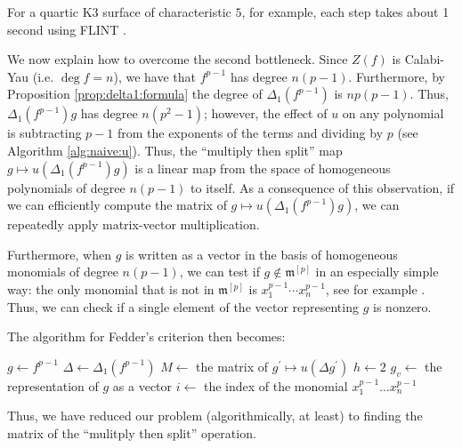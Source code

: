\documentclass[a4paper]{article}
\theoremstyle{definition}
\theoremstyle{remark}
\begin{document}
\noindent For a quartic K3 surface of characteristic \(5\),
for example, each step takes about 1 second 
using FLINT \cite{flint-2023-flint}. 

We now explain how to overcome the second
bottleneck. Since \(Z(f)\) is Calabi-Yau
(i.e. \(\deg f = n\)), we have that \(f^{p-1}\) has degree
\(n(p-1)\). 
Furthermore, by Proposition \ref{prop:delta1:formula}
the degree of \(\Delta_{1}(f^{p-1})\) 
is \(np(p - 1)\).
Thus, \(\Delta_{1}(f^{p-1})g\) has degree
\(n(p^{2} - 1)\); however, the effect 
of \(u\) on any polynomial is subtracting \(p-1\)
from the exponents of the terms and dividing by \(p\) 
(see Algorithm \ref{alg:naive:u}).
Thus, the ``multiply then split'' map 
\(g \mapsto u(\Delta_{1}(f^{p-1}) g)\) 
is a linear map from 
the space of homogeneous polynomials of degree \(n(p-1)\) 
to itself.
As a consequence of this observation,
if we can efficiently compute the matrix of 
\(g \mapsto u(\Delta_{1}(f^{p-1})g)\),
we can repeatedly apply matrix-vector multiplication.

Furthermore, when \(g\) is written as a vector 
in the basis of homogeneous monomials of degree
\(n(p-1)\), we can test if \(g \notin \mathfrak{m}^{[p]}\) 
in an especially simple way: the only 
monomial that is not in \(\mathfrak{m}^{[p]}\) is
\(x_{1}^{p-1}\cdots x_{n}^{p-1}\), 
see for example \cite{kty-2022-fedder}.
Thus, we can check if a single element of the vector representing
\(g\) is nonzero.

The algorithm for Fedder's criterion then becomes:

\begin{algorithm}[H]
\caption{Quasi-\(F\)-split height: matrix-based algorithm}
\label{alg:qfs:matrix}
$g \gets f^{p - 1}$\;
$\Delta \gets \Delta_1(f^{p - 1})$\;
$M \gets $ the matrix of $g^{\prime} \mapsto u(\Delta g^{\prime})$\;
$h \gets 2$\;
$g_v \gets $ the representation of $g$ as a vector\;
$i \gets $ the index of the monomial $x_{1}^{p - 1} \dots x_{n}^{p - 1}$\;
\end{algorithm}

Thus, we have reduced our problem (algorithmically, at least)
to finding the matrix of the ``mulitply then split'' operation.
\end{document}
